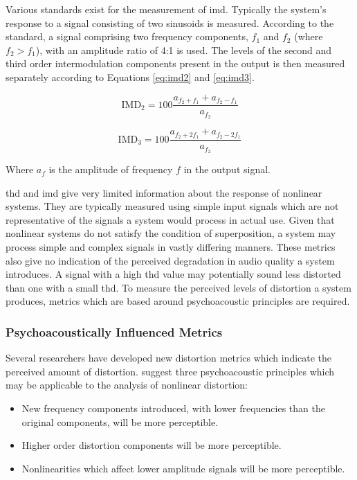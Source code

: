 			Various standards exist for the measurement of \acrshort{imd}. Typically the system's response to a
			signal consisting of two sinusoids is measured. According to the \citet{IEC2001amplifiers}
			standard, a signal comprising two frequency components, $f_{1}$ and $f_{2}$ (where $f_{2} >
			f_{1}$), with an amplitude ratio of 4:1 is used.  The levels of the second and third order
			intermodulation components present in the output is then measured separately according to Equations
			\ref{eq:imd2} and \ref{eq:imd3}.

			\begin{equation}
				\mathrm{IMD}_{2} = 100\frac{a_{f_{2} + f_{1}} + a_{f_{2} - f_{1}}}{a_{f_{2}}}
				\label{eq:imd2}
			\end{equation}

			\begin{equation}
				\mathrm{IMD}_{3} = 100\frac{a_{f_{2} + 2f_{1}} + a_{f_{2} - 2f_{1}}}{a_{f_{2}}}
				\label{eq:imd3}
			\end{equation}

			Where $a_{f}$ is the amplitude of frequency $f$ in the output signal.

			\acrshort{thd} and \acrshort{imd} give very limited information about the response of nonlinear
			systems. They are typically measured using simple input signals which are not representative of the
			signals a system would process in actual use. Given that nonlinear systems do not satisfy the
			condition of superposition, a system may process simple and complex signals in vastly differing
			manners. These metrics also give no indication of the perceived degradation in audio quality a
			system introduces.  A signal with a high \acrshort{thd} value may potentially sound less distorted
			than one with a small \acrshort{thd}. To measure the perceived levels of distortion a system
			produces, metrics which are based around psychoacoustic principles are required.

		\subsubsection*{Psychoacoustically Influenced Metrics}
			Several researchers have developed new distortion metrics which indicate the perceived amount of
			distortion. \citet{geddes2003auditory} suggest three psychoacoustic principles which may be
			applicable to the analysis of nonlinear distortion:

			\begin{itemize}
				\item New frequency components introduced, with lower frequencies than the original
					components, will be more perceptible.
				\item Higher order distortion components will be more perceptible.
				\item Nonlinearities which affect lower amplitude signals will be more perceptible.
			\end{itemize}

